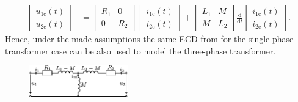 \begin{frame}
\begin{align}
		\begin{bmatrix}	u_\mathrm{1c}(t)\\u_\mathrm{2c}(t) \end{bmatrix} &= \begin{bmatrix} R_1 & 0 \\ 0 & R_2 \end{bmatrix} \begin{bmatrix} i_\mathrm{1c}(t)\\i_\mathrm{2c}(t) \end{bmatrix} + \begin{bmatrix} L_1 & M \\ M & L_2 \end{bmatrix} \frac{\mathrm{d}}{\mathrm{d}t} \begin{bmatrix} i_\mathrm{1c}(t)\\i_\mathrm{2c}(t) \end{bmatrix}.
	\end{align}
	\pause
	Hence, under the made assumptions the same ECD from  for the single-phase transformer case can be also used to model the three-phase transformer.
	\begin{figure}
		\centering
		\includegraphics[width=0.38\textwidth]{fig/lec04/Transformer_T_ECD.pdf}
	\end{figure}
\end{frame}